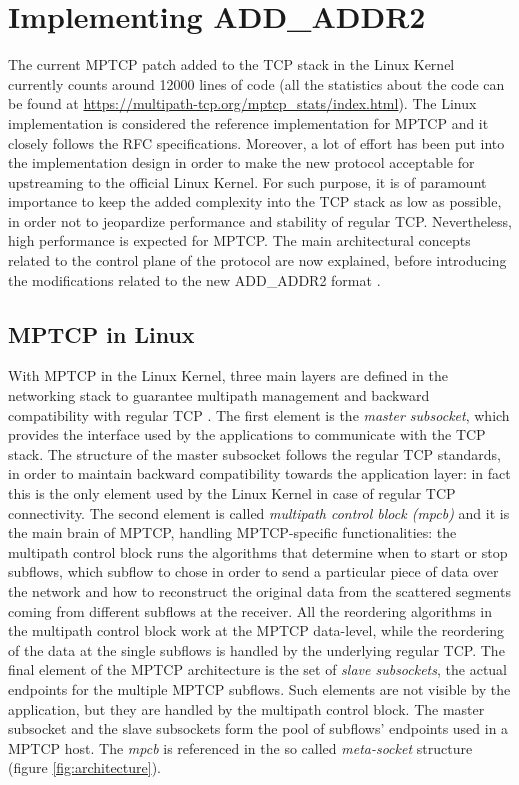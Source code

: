 \section{Implementing ADD\_ADDR2}
The current MPTCP patch added to the TCP stack in the Linux Kernel currently counts around 12000 lines of code (all the statistics about the code can be found at \url{https://multipath-tcp.org/mptcp\_stats/index.html}). The Linux implementation is considered the reference implementation for MPTCP and it closely follows the RFC specifications. Moreover, a lot of effort has been put into the implementation design in order to make the new protocol acceptable for upstreaming to the official Linux Kernel. For such purpose, it is of paramount importance to keep the added complexity into the TCP stack as low as possible, in order not to jeopardize performance and stability of regular TCP. Nevertheless, high performance is expected for MPTCP. The main architectural concepts related to the control plane of the protocol are now explained, before introducing the modifications related to the new ADD\_ADDR2 format \cite{rfc6824bis04}.

\subsection{MPTCP in Linux}
With MPTCP in the Linux Kernel, three main layers are defined in the networking stack to guarantee multipath management and backward compatibility with regular TCP \cite{BPB11}. The first element is the \textit{master subsocket}, which provides the interface used by the applications to communicate with the TCP stack. The structure of the master subsocket follows the regular TCP standards, in order to maintain backward compatibility towards the application layer: in fact this is the only element used by the Linux Kernel in case of regular TCP connectivity. The second element is called \textit{multipath control block (mpcb)} and it is the main brain of MPTCP, handling MPTCP-specific functionalities: the multipath control block runs the algorithms that determine when to start or stop subflows, which subflow to chose in order to send a particular piece of data over the network and how to reconstruct the original data from the scattered segments coming from different subflows at the receiver. All the reordering algorithms in the multipath control block work at the MPTCP data-level, while the reordering of the data at the single subflows is handled by the underlying regular TCP. The final element of the MPTCP architecture is the set of \textit{slave subsockets}, the actual endpoints for the multiple MPTCP subflows. Such elements are not visible by the application, but they are handled by the multipath control block. The master subsocket and the slave subsockets form the pool of subflows' endpoints used in a MPTCP host. The \textit{mpcb} is referenced in the so called \textit{meta-socket} structure (figure \ref{fig:architecture}).

